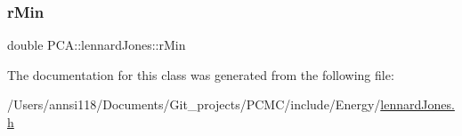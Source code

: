 \subsubsection{\texorpdfstring{r\+Min}{rMin}}
{\footnotesize\ttfamily double P\+C\+A\+::lennard\+Jones\+::r\+Min\hspace{0.3cm}{\ttfamily [private]}}



The documentation for this class was generated from the following file\+:\begin{DoxyCompactItemize}
\item 
/\+Users/annsi118/\+Documents/\+Git\+\_\+projects/\+P\+C\+M\+C/include/\+Energy/\hyperlink{lennard_jones_8h}{lennard\+Jones.\+h}\end{DoxyCompactItemize}
